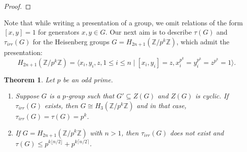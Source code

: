 \documentclass[a4paper,11pt]{amsart}
\numberwithin{equation}{section}
\numberwithin{equation}{subsection}
\newtheorem{theorem}{Theorem}[section]
\newcommand{\Z}{\mathbb{Z}}
\begin{document}
\begin{proof}
\end{proof}
Note that while writing a presentation of a group, we omit relations of the form $[x, y] = 1$ for generators $x, y \in G$.  
Our next aim is to describe $\tau(G)$ and $\tau_{irr}(G)$ for the Heisenberg groups $G = H_{2n+1}(\Z/p^k\Z)$, which admit the presentation: 
$$H_{2n+1}(\Z/p^k\Z)= \langle x_i, y_i, z, 1\leq i \leq n \mid [x_i, y_i] = z, x_i^{p^k} = y_i^{p^k} = z^{p^k} = 1 \rangle.$$
\begin{theorem} \label{Heisenberg group}
	Let $p$ be an odd prime. 
	\begin{enumerate}
		\item Suppose $G$ is a $p$-group such that $G' \subseteq Z(G)$ and $Z(G)$ is cyclic. If $\tau_{irr}(G)$ exists, then $G \cong H_{3}(\Z/p^k\Z)$ and in that case, $\tau_{irr}(G)= \tau(G)= p^k$.  
		
		\item If $G= H_{2n+1}(\Z/p^k\Z)$ with $n > 1$, then $\tau_{irr}(G)$ does not exist and $\tau(G) \leq p^{k\lfloor{n/2}\rfloor} + p^{k\lceil{n/2}\rceil}$.
	\end{enumerate}
	
\end{theorem}
\end{document}
